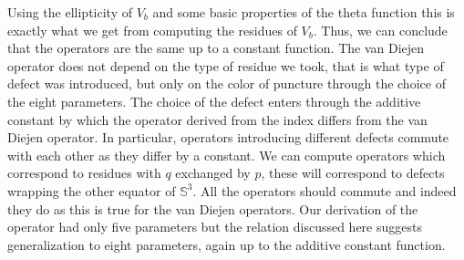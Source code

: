 \documentclass[a4paper,12pt]{article}
\begin{document}
Using the ellipticity of $V_b$ and some basic properties of the theta function this is exactly what we get from computing the residues of $V_b$. Thus, we can conclude that the operators are the same up to a constant function. The van Diejen operator does not depend on the type of residue we took, that is what type of defect was introduced, but only on the color of puncture through the choice of the eight parameters. The choice of the defect enters through the additive constant by which the operator derived from the index differs from the van Diejen operator. In particular, operators introducing different defects commute with each other as they differ by a constant. We can compute operators which correspond to residues with $q$ exchanged by $p$, these will correspond to defects wrapping the other equator of ${\mathbb S}^3$. All the operators should commute and indeed they do as this is true for the van Diejen operators. Our derivation of the operator had only five parameters but the relation discussed here suggests generalization to eight parameters, again up to the additive constant function.
\end{document}
